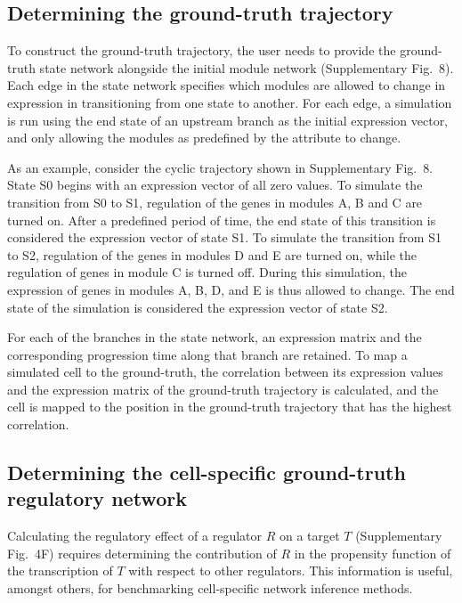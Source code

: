 \documentclass[10pt, a4paper]{article}
\begin{document}
\hypertarget{sec:dyngen-groundtruth}{%
	\subsection{Determining the ground-truth
		trajectory}\label{sec:dyngen-groundtruth}}

To construct the ground-truth trajectory, the user needs to provide the
ground-truth state network alongside the initial module network
(Supplementary Fig.~8). Each edge in the state network specifies which
modules are allowed to change in expression in transitioning from one
state to another. For each edge, a simulation is run using the end state
of an upstream branch as the initial expression vector, and only
allowing the modules as predefined by the attribute to change.

As an example, consider the cyclic trajectory shown in Supplementary
Fig.~8. State S0 begins with an expression vector of all zero values. To
simulate the transition from S0 to S1, regulation of the genes in
modules A, B and C are turned on. After a predefined period of time, the
end state of this transition is considered the expression vector of
state S1. To simulate the transition from S1 to S2, regulation of the
genes in modules D and E are turned on, while the regulation of genes in
module C is turned off. During this simulation, the expression of genes
in modules A, B, D, and E is thus allowed to change. The end state of
the simulation is considered the expression vector of state S2.

For each of the branches in the state network, an expression matrix and
the corresponding progression time along that branch are retained. To
map a simulated cell to the ground-truth, the correlation between its
expression values and the expression matrix of the ground-truth
trajectory is calculated, and the cell is mapped to the position in the
ground-truth trajectory that has the highest correlation.

\hypertarget{sec:dyngen-extractgrn}{%
	\subsection{Determining the cell-specific ground-truth regulatory
		network}\label{sec:dyngen-extractgrn}}

Calculating the regulatory effect of a regulator \(R\) on a target \(T\)
(Supplementary Fig.~4F) requires determining the contribution of \(R\)
in the propensity function of the transcription of \(T\) with respect to
other regulators. This information is useful, amongst others, for
benchmarking cell-specific network inference methods.
\end{document}
